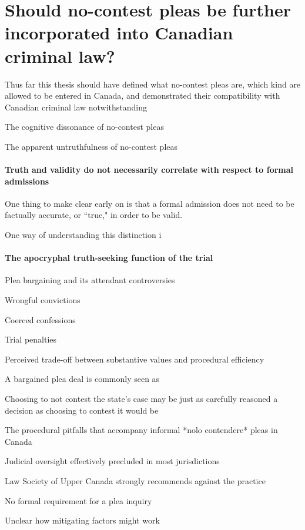 \chapter{Should no-contest pleas be further incorporated into Canadian criminal law?}

Thus far this thesis should have defined what no-contest pleas are, which kind are allowed to be entered in Canada, and demonstrated their compatibility with Canadian criminal law notwithstanding

The cognitive dissonance of no-contest pleas

The apparent untruthfulness of no-contest pleas

\subsubsection{Truth and validity do not necessarily correlate with respect to formal admissions}

One thing to make clear early on is that a formal admission does not need to be factually accurate, or ``true," in order to be valid. 

One way of understanding this distinction i

\subsubsection{The apocryphal truth-seeking function of the trial}

Plea bargaining and its attendant controversies

Wrongful convictions

Coerced confessions

Trial penalties

Perceived trade-off between substantive values and procedural efficiency

A bargained plea deal is commonly seen as

Choosing to not contest the state's case may be just as carefully reasoned a decision as choosing to contest it would be

The procedural pitfalls that accompany informal *nolo contendere* pleas in Canada

Judicial oversight effectively precluded in most jurisdictions

Law Society of Upper Canada strongly recommends against the practice

No formal requirement for a plea inquiry

Unclear how mitigating factors might work


